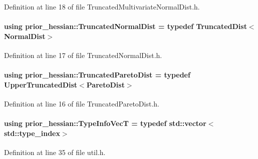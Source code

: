 Definition at line 18 of file Truncated\+Multivariate\+Normal\+Dist.\+h.

\paragraph[{\texorpdfstring{Truncated\+Normal\+Dist}{TruncatedNormalDist}}]{\setlength{\rightskip}{0pt plus 5cm}using {\bf prior\+\_\+hessian\+::\+Truncated\+Normal\+Dist} = typedef {\bf Truncated\+Dist}$<${\bf Normal\+Dist}$>$}\hypertarget{namespaceprior__hessian_a47f38d4bb5d31fd3f01f5eb6ba6f1223}{}\label{namespaceprior__hessian_a47f38d4bb5d31fd3f01f5eb6ba6f1223}


Definition at line 17 of file Truncated\+Normal\+Dist.\+h.

\paragraph[{\texorpdfstring{Truncated\+Pareto\+Dist}{TruncatedParetoDist}}]{\setlength{\rightskip}{0pt plus 5cm}using {\bf prior\+\_\+hessian\+::\+Truncated\+Pareto\+Dist} = typedef {\bf Upper\+Truncated\+Dist}$<${\bf Pareto\+Dist}$>$}\hypertarget{namespaceprior__hessian_afebdccc7e1a35836f660f8a301af9cb2}{}\label{namespaceprior__hessian_afebdccc7e1a35836f660f8a301af9cb2}


Definition at line 16 of file Truncated\+Pareto\+Dist.\+h.

\paragraph[{\texorpdfstring{Type\+Info\+VecT}{TypeInfoVecT}}]{\setlength{\rightskip}{0pt plus 5cm}using {\bf prior\+\_\+hessian\+::\+Type\+Info\+VecT} = typedef std\+::vector$<$std\+::type\+\_\+index$>$}\hypertarget{namespaceprior__hessian_acfdf544db12888f88bafb2e671841352}{}\label{namespaceprior__hessian_acfdf544db12888f88bafb2e671841352}


Definition at line 35 of file util.\+h.

